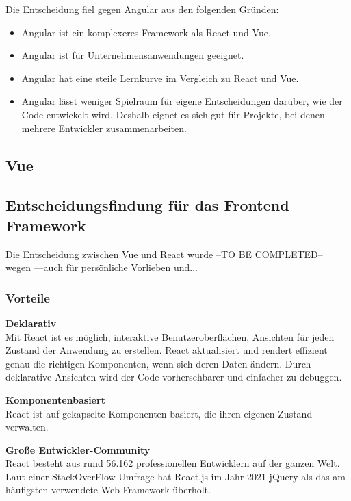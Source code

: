 Die Entscheidung fiel gegen Angular aus den folgenden Gründen:
\begin{itemize}
  \item
        Angular ist ein komplexeres Framework als React und Vue.
  \item
        Angular ist für Unternehmensanwendungen geeignet.
  \item
        Angular hat eine steile Lernkurve im Vergleich zu React und Vue.{\cite{E01}}
  \item
        Angular lässt weniger Spielraum für eigene Entscheidungen darüber, wie der Code entwickelt wird. Deshalb eignet es sich gut für Projekte, bei denen mehrere Entwickler zusammenarbeiten.
\end{itemize}
\subsection{Vue}


\subsection{Entscheidungsfindung für das Frontend Framework}
Die Entscheidung zwischen Vue und React wurde --TO BE COMPLETED-- wegen ---auch für persönliche Vorlieben und...
\newline
\subsubsection{Vorteile}
\textbf{Deklarativ} \\
Mit React ist es möglich, interaktive Benutzeroberflächen, Ansichten für jeden Zustand der Anwendung zu erstellen. React aktualisiert und rendert effizient genau die richtigen Komponenten, wenn sich deren Daten ändern.
Durch deklarative Ansichten wird der Code vorhersehbarer und einfacher zu debuggen.
\newline

\textbf{Komponentenbasiert}\\
React ist auf gekapselte Komponenten basiert, die ihren eigenen Zustand verwalten.
\newline

\textbf{Große Entwickler-Community}\\
React besteht aus rund 56.162 professionellen Entwicklern auf der ganzen Welt.
Laut einer StackOverFlow Umfrage hat React.js im Jahr 2021 jQuery als das am häufigsten verwendete Web-Framework überholt. {\cite{SO01}}
\newpage

